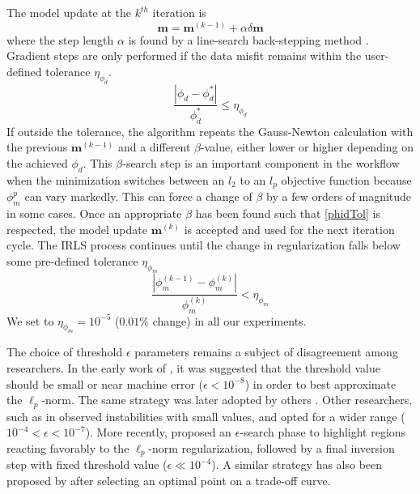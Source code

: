 \documentclass[extra,referee]{gji}
\begin{document}
The model update at the $k^{th}$ iteration is
\begin{equation}
\mathbf{m} = \mathbf{m}^{(k-1)} + \alpha \delta \mathbf{m}
\end{equation}
where the step length $\alpha$ is found by a line-search back-stepping method \cite[]{NocedalWright99}.
Gradient steps are only performed if the data misfit remains within the user-defined tolerance $\eta_{\phi_d}$.
\begin{equation}\label{phidTol}
\frac{|\phi_d- \phi_d^*|}{\phi_d^*} \leq \eta_{\phi_d}
\end{equation}
If outside the tolerance, the algorithm repeats the Gauss-Newton calculation with the previous $\mathbf{m}^{(k-1)}$ and a different $\beta$-value, either lower or higher depending on the achieved $\phi_d$. This $\beta$-search step is an important component in the workflow when the minimization switches between an $l_2$ to an $l_p$ objective function because $\phi_m^p$ can vary markedly. This can force a change of $\beta$ by a few orders of magnitude in some cases.
Once an appropriate $\beta$ has been found such that \eqref{phidTol} is respected, the model update $\mathbf{m}^{(k)}$ is accepted and used for the next iteration cycle. The IRLS process continues until the change in regularization falls below some pre-defined tolerance $\eta_{\phi_m}$
\begin{equation}\label{phimTol}
\frac{|\phi_m^{(k-1)}-\phi_m^{(k)}|}{\phi_m^{(k)}} < \eta_{\phi_m}
\end{equation}
We set to $\eta_{\phi_m} =10^{-5}$ ($0.01\%$ change) in all our experiments.

The choice of threshold $\epsilon$ parameters remains a subject of disagreement among researchers.
In the early work of \citet{LastKubik83}, it was suggested that the threshold value should be small or near machine error ($\epsilon < 10^{-8}$) in order to best approximate the $\ell_p$-norm. The same strategy was later adopted by others \cite[]{BarbosaSilva94, Stocco09}.
Other researchers, such as in \citet{Ajo-Franklin07} observed instabilities with small values, and opted for a wider range ($10^{-4} < \epsilon < 10^{-7}$).
More recently, \citet{SunLi14} proposed an $\epsilon$-search phase to highlight regions reacting favorably to the $\ell_p$-norm regularization, followed by a final inversion step with fixed threshold value ($\epsilon \ll 10^{-4}$). A similar strategy has also been proposed by \citet{ZhdanovTolstaya2004} after selecting an optimal point on a trade-off curve.
\end{document}
